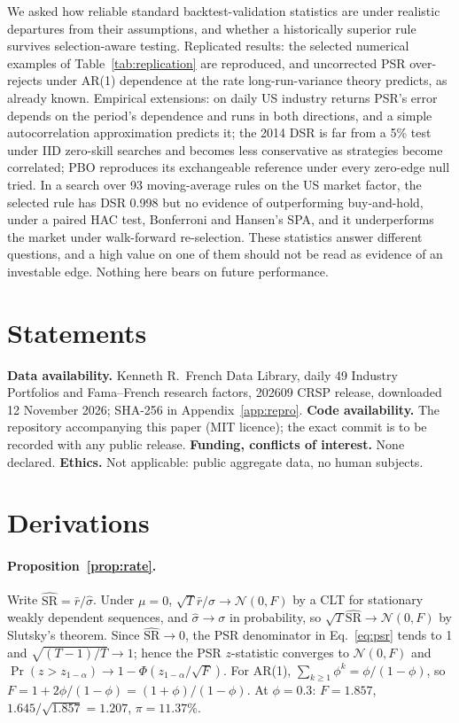 \documentclass[11pt,a4paper]{article}
\newcommand{\hSR}{\widehat{\mathrm{SR}}}
\theoremstyle{remark}
\begin{document}
We asked how reliable standard backtest-validation statistics are under realistic departures from their assumptions, and whether a historically superior rule survives selection-aware testing. Replicated results: the selected numerical examples of Table~\ref{tab:replication} are reproduced, and uncorrected PSR over-rejects under AR(1) dependence at the rate long-run-variance theory predicts, as already known. Empirical extensions: on daily US industry returns PSR's error depends on the period's dependence and runs in both directions, and a simple autocorrelation approximation predicts it; the 2014 DSR is far from a 5\% test under IID zero-skill searches and becomes less conservative as strategies become correlated; PBO reproduces its exchangeable reference under every zero-edge null tried. In a search over 93 moving-average rules on the US market factor, the selected rule has DSR 0.998 but no evidence of outperforming buy-and-hold, under a paired HAC test, Bonferroni and Hansen's SPA, and it underperforms the market under walk-forward re-selection. These statistics answer different questions, and a high value on one of them should not be read as evidence of an investable edge. Nothing here bears on future performance.

\section*{Statements}
\textbf{Data availability.} Kenneth R.\ French Data Library, daily 49 Industry Portfolios and Fama--French research factors, 202609 CRSP release, downloaded 12 November 2026; SHA-256 in Appendix~\ref{app:repro}. \textbf{Code availability.} The repository accompanying this paper (MIT licence); the exact commit is to be recorded with any public release. \textbf{Funding, conflicts of interest.} None declared. \textbf{Ethics.} Not applicable: public aggregate data, no human subjects.




\appendix

\section{Derivations}\label{app:derivations}

\paragraph{Proposition~\ref{prop:rate}.} Write $\hSR=\bar r/\hat\sigma$. Under $\mu=0$, $\sqrt T\bar r/\sigma\to\mathcal N(0,F)$ by a CLT for stationary weakly dependent sequences, and $\hat\sigma\to\sigma$ in probability, so $\sqrt T\hSR\to\mathcal N(0,F)$ by Slutsky's theorem. Since $\hSR\to0$, the PSR denominator in Eq.~\eqref{eq:psr} tends to 1 and $\sqrt{(T-1)/T}\to1$; hence the PSR $z$-statistic converges to $\mathcal N(0,F)$ and $\Pr(z>z_{1-\alpha})\to1-\Phi(z_{1-\alpha}/\sqrt F)$. For AR(1), $\sum_{k\ge1}\phi^k=\phi/(1-\phi)$, so $F=1+2\phi/(1-\phi)=(1+\phi)/(1-\phi)$. At $\phi=0.3$: $F=1.857$, $1.645/\sqrt{1.857}=1.207$, $\pi=11.37\%$.
\end{document}
